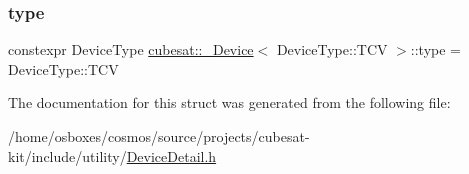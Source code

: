 \subsubsection{\texorpdfstring{type}{type}}
{\footnotesize\ttfamily constexpr Device\+Type \hyperlink{structcubesat_1_1__Device}{cubesat\+::\+\_\+\+Device}$<$ Device\+Type\+::\+T\+CV $>$\+::type = Device\+Type\+::\+T\+CV\hspace{0.3cm}{\ttfamily [static]}}



The documentation for this struct was generated from the following file\+:\begin{DoxyCompactItemize}
\item 
/home/osboxes/cosmos/source/projects/cubesat-\/kit/include/utility/\hyperlink{DeviceDetail_8h}{Device\+Detail.\+h}\end{DoxyCompactItemize}
